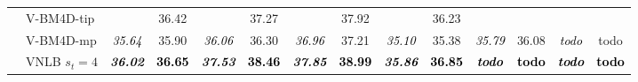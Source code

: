\documentclass[10pt, journal, twocolumn, final, a4paper]{IEEEtran}
\newcommand{\best}[1]{#1}
\newcommand{\bsic}[1]{\textcolor{black}{\textit{#1}}}
\newcommand{\Bsic}[1]{\textcolor{black}{\textbf{\textit{#1}}}}
\newcommand{\Best}[1]{\textbf{\textcolor{black}{#1}}}
\begin{document}
\begin{table}[htp!]
\begin{center}
{\begin{tabular}{ c | l |c c | c c | c c | c c | c c | c c}
			                      & V-BM4D-tip           & \bsic{     } & \best{36.42} & \bsic{     } & \best{37.27} & \bsic{     } &       37.92  & \bsic{     } &       36.23  & \bsic{     } &              & \bsic{     } &              \\
			                      & V-BM4D-mp            & \bsic{35.64} &       35.90  & \bsic{36.06} &       36.30  & \bsic{36.96} &       37.21  & \bsic{35.10} &       35.38  & \bsic{35.79} &       36.08  & \bsic{todo } &       todo   \\
			                      & VNLB   $s_t = 4$     & \Bsic{36.02} & \Best{36.65} & \Bsic{37.53} & \Best{38.46} & \Bsic{37.85} & \Best{38.99} & \Bsic{35.86} & \Best{36.85} & \Bsic{todo } & \Best{todo } & \Bsic{todo } & \Best{todo } \\\hline

\end{tabular}}
\end{center}
\end{table}
\end{document}
